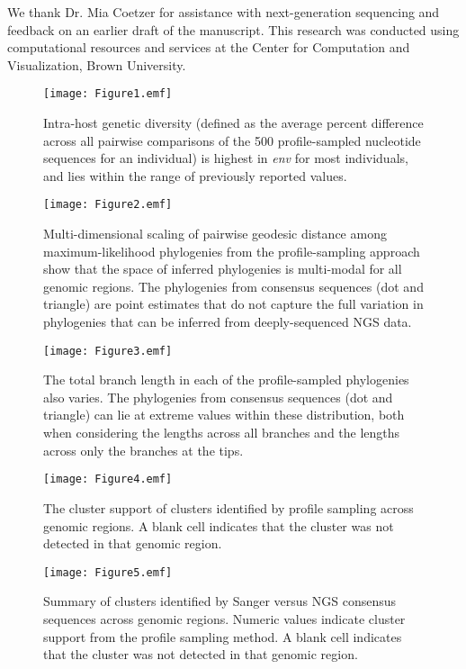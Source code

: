 \documentclass[letterpaper]{article}
\begin{document}
We thank Dr. Mia Coetzer for assistance with next-generation sequencing and feedback on an earlier draft of the manuscript. This research was conducted using computational resources and services at the Center for Computation and Visualization, Brown University.

\printbibliography

\begin{figure}[H]
	\caption{Intra-host genetic diversity (defined as the average percent difference across all pairwise comparisons of the 500 profile-sampled nucleotide sequences for an individual) is highest in \emph{env} for most individuals, and lies within the range of previously reported values.}
	\centering
	\texttt{[image: Figure1.emf]}
\end{figure}

\begin{figure}[H]
	\caption{Multi-dimensional scaling of pairwise geodesic distance among maximum-likelihood phylogenies from the profile-sampling approach show that the space of inferred phylogenies is multi-modal for all genomic regions. The phylogenies from consensus sequences (dot and triangle) are point estimates that do not capture the full variation in phylogenies that can be inferred from deeply-sequenced NGS data.}
	\centering
	\texttt{[image: Figure2.emf]}
\end{figure}
	
\begin{figure}[H]
	\caption{The total branch length in each of the profile-sampled phylogenies also varies. The phylogenies from consensus sequences (dot and triangle) can lie at extreme values within these distribution, both when considering the lengths across all branches and the lengths across only the branches at the tips.}
	\centering
	\texttt{[image: Figure3.emf]}
\end{figure}

\begin{figure}[H]
	\caption{The cluster support of clusters identified by profile sampling across genomic regions. A blank cell indicates that the cluster was not detected in that genomic region.}
	\centering
	\texttt{[image: Figure4.emf]}
\end{figure}

\begin{figure}[H]
	\caption{Summary of clusters identified by Sanger versus NGS consensus sequences across genomic regions. Numeric values indicate cluster support from the profile sampling method. A blank cell indicates that the cluster was not detected in that genomic region.}
	\centering
	\texttt{[image: Figure5.emf]}
\end{figure}
\end{document}
